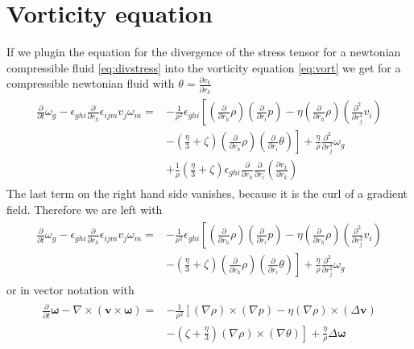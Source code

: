 \documentclass[a4paper,
					12pt,
					twoside,
					pagesize,
					cleardoubleplain,
					headsepline,
					bibtotoc
					]{scrbook}
\renewcommand{\vec}[1]{\boldsymbol{#1}}
\newcommand{\lra}[1]{{ \left( #1 \right) }}
\newcommand{\pd}[1]{\frac{\partial}{\partial #1}}
\newcommand{\ppd}[2]{\frac{\partial #2}{\partial #1}}
\newcommand{\pdd}[1]{\frac{\partial^2}{\partial #1^2}}
\begin{document}
\section{Vorticity equation}
If we plugin the equation for the divergence of the
stress tensor for a newtonian compressible fluid \eqref{eq:divstress} into
the vorticity equation \eqref{eq:vort} we get for a compressible newtonian
fluid with $\theta=\ppd{r_k}{v_k}$
\begin{align}
\begin{split}
\pd{t}\omega_g
-\epsilon_{ghi}\pd{r_h} \epsilon_{ijm} v_j \omega_m =
&-\frac{1}{\rho^2}\epsilon_{ghi}\left[
\lra{\pd{r_h}\rho} \lra{\pd{r_i}p}
-\eta \lra{\pd{r_h}\rho} \lra{\pdd{r_j}v_i}\right.\\
&\left.-\lra{\frac{\eta}{3}+\zeta} \lra{\pd{r_h}\rho} 
\lra{\pd{r_i}\theta} \right]
+\frac{\eta}{\rho}\pdd{r_j}\omega_g \\
&+\frac{1}{\rho}\lra{\frac{\eta}{3}
+\zeta}\epsilon_{ghi}\pd{r_h}\pd{r_i}\lra{\ppd{r_k}{v_k}}
\end{split}
\end{align}
The last term on the right hand side vanishes, because it is the curl
of a gradient field. Therefore we are left with
\begin{align}
\begin{split}
\pd{t}\omega_g
-\epsilon_{ghi}\pd{r_h} \epsilon_{ijm} v_j \omega_m =
&-\frac{1}{\rho^2}\epsilon_{ghi}\left[
\lra{\pd{r_h}\rho} \lra{\pd{r_i}p}
-\eta \lra{\pd{r_h}\rho} \lra{\pdd{r_j}v_i}\right.\\
&\left.-\lra{\frac{\eta}{3}+\zeta} \lra{\pd{r_h}\rho} 
\lra{\pd{r_i}\theta} \right]
+\frac{\eta}{\rho}\pdd{r_j}\omega_g
\end{split}
\end{align}
or in vector notation with 
\begin{align}
\begin{split}
\pd{t} \vec{\omega}-\nabla \times (\vec{v} \times \vec{\omega}) = 
&-\frac{1}{\rho^2}\left[
(\nabla \rho) \times(\nabla p)
- \eta (\nabla \rho) \times (\Delta \vec{v})\right.\\
&\left.- \lra{\zeta +\frac{\eta}{3}} (\nabla \rho) \times (\nabla
\theta)\right]
+\frac{\eta}{\rho} \Delta \vec{\omega}
\end{split}
\end{align}
\end{document}
